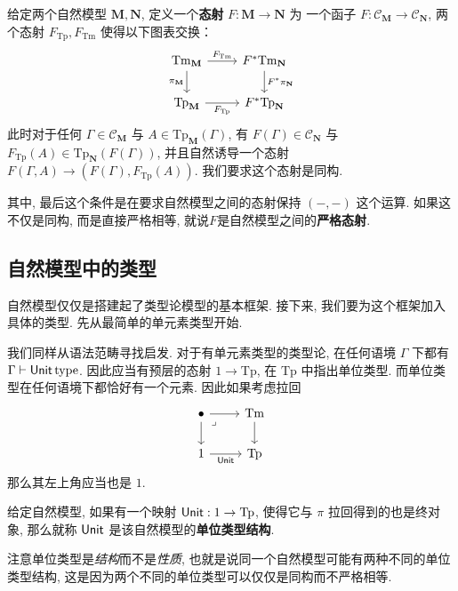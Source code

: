 \begin{definition}
给定两个自然模型 \(\mathbf M, \mathbf N\),
定义一个\textbf{态射} \(F : \mathbf M \to \mathbf N\) 为
一个函子 \(F : \mathcal C_{\mathbf M} \to \mathcal C_{\mathbf N}\),
两个态射 \(F_{\mathrm{Tp}} , F_{\mathrm{Tm}}\) 使得以下图表交换：
\[\begin{tikzcd}
  {\mathrm{Tm}_{\mathbf M}} & {F^*\mathrm{Tm}_{\mathbf N}} \\
  {\mathrm{Tp}_{\mathbf M}} & {F^*\mathrm{Tp}_{\mathbf N}}
  \arrow["{F_{\mathrm{Tp}}}"', from=2-1, to=2-2]
  \arrow["{F_{\mathrm{Tm}}}", from=1-1, to=1-2]
  \arrow["{\pi_{\mathbf M}}"', from=1-1, to=2-1]
  \arrow["{F^* \pi_{\mathbf N}}", from=1-2, to=2-2]
\end{tikzcd}\]
此时对于任何 \(\Gamma \in \mathcal C_{\mathbf M}\) 与
\(A \in \mathrm{Tp}_{\mathbf M}(\Gamma)\), 有
\(F(\Gamma) \in \mathcal C_{\mathbf N}\) 与
\(F_{\mathrm{Tp}}(A) \in \mathrm{Tp}_{\mathbf N}(F(\Gamma))\),
并且自然诱导一个态射 \(F(\Gamma, A) \to (F(\Gamma), F_{\mathrm{Tp}}(A))\).
我们要求这个态射是同构.
\end{definition}

其中, 最后这个条件是在要求自然模型之间的态射保持 \((-,-)\) 这个运算.
如果这不仅是同构, 而是直接严格相等, 就说\(F\)是自然模型之间的\textbf{严格态射}.

\subsection{自然模型中的类型}

自然模型仅仅是搭建起了类型论模型的基本框架.
接下来, 我们要为这个框架加入具体的类型.
先从最简单的单元素类型开始.

我们同样从语法范畴寻找启发. 对于有单元素类型的类型论,
在任何语境 \(\Gamma\) 下都有 \(\Gamma \vdash \textnormal{\textsf{Unit}}\,\text{type}\).
因此应当有预层的态射 \(1 \to \mathrm{Tp}\),
在 \(\mathrm{Tp}\) 中指出单位类型.
而单位类型在任何语境下都恰好有一个元素. 因此如果考虑拉回
\[\begin{tikzcd}
  \bullet & {\mathrm{Tm}} \\
  1 & {\mathrm{Tp}}
  \arrow[from=1-2, to=2-2]
  \arrow["{\cons{Unit}}"', from=2-1, to=2-2]
  \arrow[from=1-1, to=2-1]
  \arrow[from=1-1, to=1-2]
  \arrow["\lrcorner"{anchor=center, pos=0.125}, draw=none, from=1-1, to=2-2]
\end{tikzcd}\]
那么其左上角应当也是 \(1\).
\begin{definition}
给定自然模型,
如果有一个映射 \(\textnormal{\textsf{Unit}} : 1 \to \mathrm{Tp}\),
使得它与 \(\pi\) 拉回得到的也是终对象, 那么就称
\(\textnormal{\textsf{Unit}}\) 是该自然模型的\textbf{单位类型结构}.
\end{definition}
注意单位类型是\emph{结构}而不是\emph{性质},
也就是说同一个自然模型可能有两种不同的单位类型结构,
这是因为两个不同的单位类型可以仅仅是同构而不严格相等.

